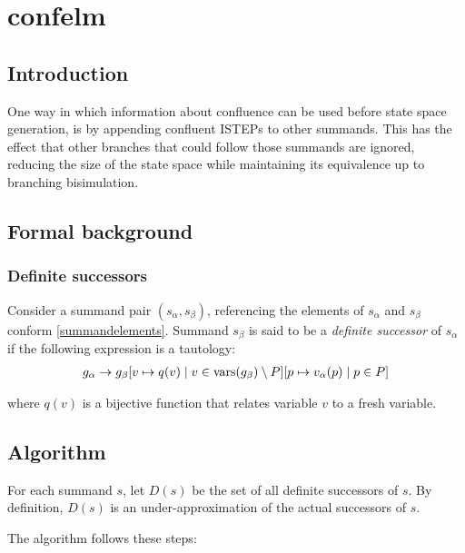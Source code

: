 \chapter{confelm}

\section{Introduction}
One way in which information about confluence can be used before state space generation, is by appending confluent ISTEPs to other summands.
This has the effect that other branches that could follow those summands are ignored, reducing the size of the state space while maintaining its equivalence up to branching bisimulation.

\section{Formal background}

\subsection{Definite successors}

Consider a summand pair $(s_\alpha, s_\beta)$, referencing the elements of $s_\alpha$ and $s_\beta$ conform \ref{summandelements}.
Summand $s_\beta$ is said to be a \emph{definite successor} of $s_\alpha$ if the following expression is a tautology:
\begin{align*}
g_\alpha \rightarrow {g_\beta}[v \mapsto q(v) \;|\; v \in \text{vars}(g_\beta) \setminus P][p \mapsto v_\alpha(p) \;|\; p \in P]
\end{align*}

where $q(v)$ is a bijective function that relates variable $v$ to a fresh variable.

\section{Algorithm}

For each summand $s$, let $D(s)$ be the set of all definite successors of $s$.
By definition, $D(s)$ is an under-approximation of the actual successors of $s$.

The algorithm follows these steps:

